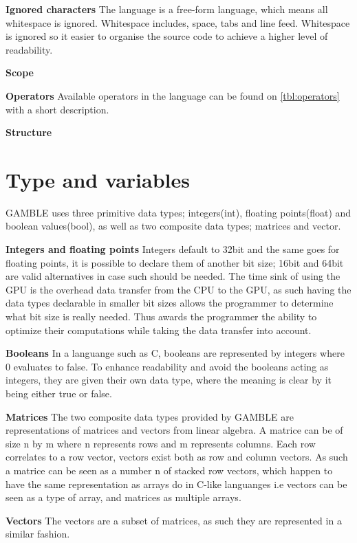 \textbf{Ignored characters}
The language is a free-form language, which means all whitespace is ignored.
Whitespace includes, space, tabs and line feed.
Whitespace is ignored so it easier to organise the source code to achieve a higher level of readability.

\textbf{Scope}

\textbf{Operators}
Available operators in the language can be found on \ref{tbl:operators} with a short description.
  

\textbf{Structure} 


\section{Type and variables}
GAMBLE uses three primitive data types; integers(int), floating points(float) and boolean values(bool), as well as two composite data types; matrices and vector.

\textbf{Integers and floating points}
Integers default to 32bit and the same goes for floating points, it is possible to declare them of another bit size; 16bit and 64bit are valid alternatives in case such should be needed.%
The time sink of using the GPU is the overhead data transfer from the CPU to the GPU, as such having the data types declarable in smaller bit sizes allows the programmer to determine what bit size is really needed.
Thus awards the programmer the ability to optimize their computations while taking the data transfer into account.

\textbf{Booleans}
In a languange such as C, booleans are represented by integers where 0 evaluates to false.
To enhance readability and avoid the booleans acting as integers, they are given their own data type, where the meaning is clear by it being either true or false.

\textbf{Matrices}
The two composite data types provided by GAMBLE are representations of matrices and vectors from linear algebra.
A matrice can be of size n by m where n represents rows and m represents columns.
Each row correlates to a row vector, vectors exist both as row and column vectors.
As such a matrice can be seen as a number n of stacked row vectors, which happen to have the same representation as arrays do in C-like languanges i.e vectors can be seen as a type of array, and matrices as multiple arrays.

\textbf{Vectors}
The vectors are a subset of matrices, as such they are represented in a similar fashion.

